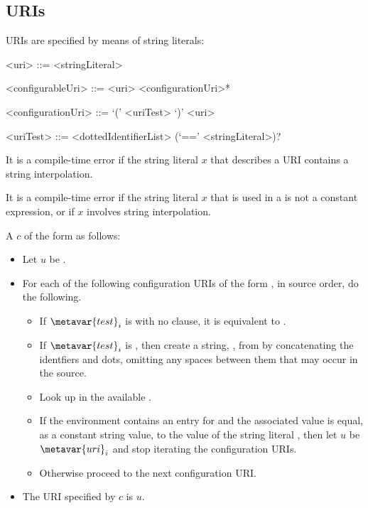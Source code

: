 \documentclass[makeidx]{article}
\begin{document}
{\subsection{URIs}

\LMHash{}%
URIs are specified by means of string literals:

\begin{grammar}
<uri> ::= <stringLiteral>

<configurableUri> ::= <uri> <configurationUri>*

<configurationUri> ::= \IF{} `(' <uriTest> `)' <uri>

<uriTest> ::= <dottedIdentifierList> (`==' <stringLiteral>)?
\end{grammar}

\LMHash{}%
It is a compile-time error if the string literal $x$ that describes a URI contains a string interpolation.

\LMHash{}%
It is a compile-time error if the string literal $x$ that is used in a  is not a constant expression, or if $x$ involves string interpolation.

\LMHash{}%
A  $c$ of the form
 as follows:
\begin{itemize}
\item{} Let $u$ be .
\item{} For each of the following configuration URIs of the form , in source order, do the following.
\begin{itemize}
  \item{} If $\metavar{test}_i$ is  with no \lit{==} clause, it is
  equivalent to .
  \item{} If $\metavar{test}_i$ is ,
  then create a string, , from 
  by concatenating the identfiers and dots,
  omitting any spaces between them that may occur in the source.
  \item{} Look up  in the available
  .
  \item{} If the environment contains an entry for  and the
  associated value is equal, as a constant string value, to the value of
  the string literal ,
  then let $u$ be $\metavar{uri}_i$ and stop iterating the configuration URIs.
  \item{} Otherwise proceed to the next configuration URI.
\end{itemize}
\item{} The URI specified by $c$ is $u$.
\end{itemize}

}
\end{document}
